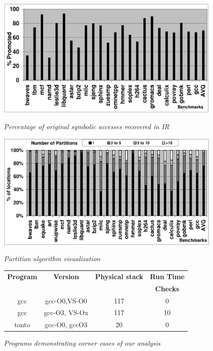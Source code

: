 \begin{figure}[t]
{
\vspace{-0.3in}
\begin{minipage}{.32\linewidth}
\centering
{
\includegraphics[width=\linewidth]{figures/EPS/origSymPromotion.eps}
\caption{\textit{Percentage of original symbolic accesses recovered in IR}}
\label{fig:OrigSymPromResult}
}
\end{minipage}
\hfill
\begin{minipage}{.38\linewidth}
\centering
{
\includegraphics[width=\linewidth]{figures/EPS/partition-visualization.eps}
\caption{\textit{Partition algorithm visualization}}
\label{fig:PartResult}
}
\end{minipage}
\hfill
\begin{minipage}{.29\linewidth}
\centering
{
\begin{tiny}
\begin{tabular}{|c|c|c|c|} %
\hline
\textbf{Program}&{\textbf{Version}}&{\textbf{Physical stack}}&{\textbf{Run Time}}\\
{}&{}&{}&{\textbf{Checks}}\\ \hline
gcc&gcc-O0,VS-O0&117&0\\\hline
gcc&gcc-O3, VS-Ox&117&10\\	\hline
tonto&gcc-O0, gccO3&20&0\\	\hline
\end{tabular}
\caption {{\textit{Programs demonstrating corner cases of our analysis }}}
\label{fig:resultsCornerCases}
\end{tiny}
}
\end{minipage}
}
\vspace{-3ex}
\end{figure}
